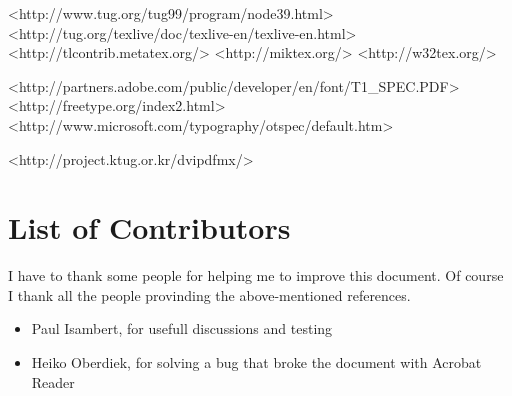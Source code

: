 \documentclass[
%
]{scrartcl}
\begin{document}
	<http://www.tug.org/tug99/program/node39.html>
	<http://tug.org/texlive/doc/texlive-en/texlive-en.html>
	<http://tlcontrib.metatex.org/>
	<http://miktex.org/>
	<http://w32tex.org/>

	<http://partners.adobe.com/public/developer/en/font/T1_SPEC.PDF>
	<http://freetype.org/index2.html>
	<http://www.microsoft.com/typography/otspec/default.htm>

	<http://project.ktug.or.kr/dvipdfmx/>
	
\clearpage
\section{List of Contributors}
I have to thank some people for helping me to improve this document. Of course I thank all the people provinding the above-mentioned references. 

\begin{itemize}
\item Paul Isambert, for usefull discussions and testing
\item Heiko Oberdiek, for solving a bug that broke the document with Acrobat Reader
\end{itemize}
\end{document}
